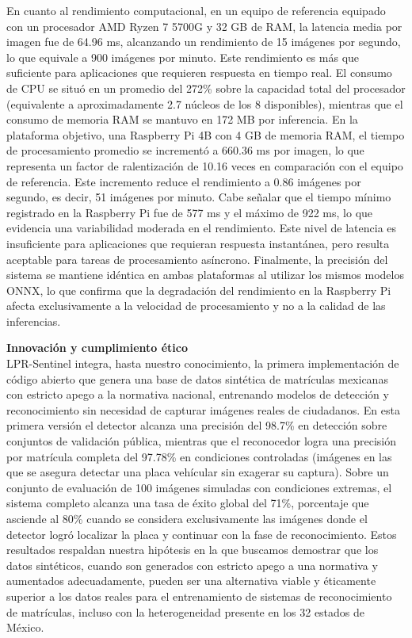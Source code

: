 En cuanto al rendimiento computacional, en un equipo de referencia equipado con un procesador AMD Ryzen 7 5700G y 32 GB de RAM, la latencia media por imagen fue de 64.96 ms, alcanzando un rendimiento de 15 imágenes por segundo, lo que equivale a 900 imágenes por minuto. Este rendimiento es más que suficiente para aplicaciones que requieren respuesta en tiempo real. El consumo de CPU se situó en un promedio del 272\% sobre la capacidad total del procesador (equivalente a aproximadamente 2.7 núcleos de los 8 disponibles), mientras que el consumo de memoria RAM se mantuvo en 172 MB por inferencia. En la plataforma objetivo, una Raspberry Pi 4B con 4 GB de memoria RAM, el tiempo de procesamiento promedio se incrementó a 660.36 ms por imagen, lo que representa un factor de ralentización de 10.16 veces en comparación con el equipo de referencia. Este incremento reduce el rendimiento a 0.86 imágenes por segundo, es decir, 51 imágenes por minuto. Cabe señalar que el tiempo mínimo registrado en la Raspberry Pi fue de 577 ms y el máximo de 922 ms, lo que evidencia una variabilidad moderada en el rendimiento. Este nivel de latencia es insuficiente para aplicaciones que requieran respuesta instantánea, pero resulta aceptable para tareas de procesamiento asíncrono. Finalmente, la precisión del sistema se mantiene idéntica en ambas plataformas al utilizar los mismos modelos ONNX, lo que confirma que la degradación del rendimiento en la Raspberry Pi afecta exclusivamente a la velocidad de procesamiento y no a la calidad de las inferencias.

{\sffamily{}\color{MASA-Blue} \textbf{Innovación y cumplimiento ético}}\\
LPR-Sentinel integra, hasta nuestro conocimiento, la primera implementación de código abierto que genera una base de datos sintética de matrículas mexicanas con estricto apego a la normativa nacional, entrenando modelos de detección y reconocimiento sin necesidad de capturar imágenes reales de ciudadanos. En esta primera versión el detector alcanza una precisión del 98.7\% en detección sobre conjuntos de validación pública, mientras que el reconocedor logra una precisión por matrícula completa del 97.78\% en condiciones controladas (imágenes en las que se asegura detectar una placa vehícular sin exagerar su captura). Sobre un conjunto de evaluación de 100 imágenes simuladas con condiciones extremas, el sistema completo alcanza una tasa de éxito global del 71\%, porcentaje que asciende al 80\% cuando se considera exclusivamente las imágenes donde el detector logró localizar la placa y continuar con la fase de reconocimiento. Estos resultados respaldan nuestra hipótesis en la que buscamos demostrar que los datos sintéticos, cuando son generados con estricto apego a una normativa y aumentados adecuadamente, pueden ser una alternativa viable y éticamente superior a los datos reales para el entrenamiento de sistemas de reconocimiento de matrículas, incluso con la heterogeneidad presente en los 32 estados de México.

